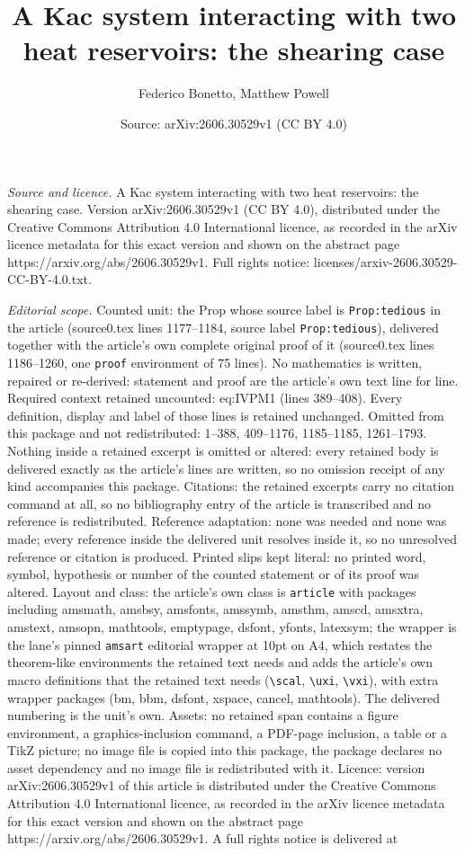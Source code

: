 \documentclass[10pt,a4paper]{amsart}
\title[A Kac system interacting with two heat reservoirs: the shear]{A Kac system interacting with two heat reservoirs: the shearing case}
\author{Federico Bonetto, Matthew Powell}
\date{Source: arXiv:2606.30529v1 (CC BY 4.0)}
\begin{document}
\maketitle

\noindent\emph{Source and licence.} A Kac system interacting with two heat reservoirs: the shearing case. Version arXiv:2606.30529v1 (CC BY 4.0), distributed under the Creative Commons Attribution 4.0 International licence, as recorded in the arXiv licence metadata for this exact version and shown on the abstract page https://arxiv.org/abs/2606.30529v1. Full rights notice: licenses/arxiv-2606.30529-CC-BY-4.0.txt.\par\smallskip

\noindent\textit{Editorial scope.} Counted unit: the Prop whose source label is \texttt{Prop:tedious} in the article (source0.tex lines 1177--1184, source label \texttt{Prop:tedious}), delivered together with the article's own complete original proof of it (source0.tex lines 1186--1260, one \texttt{proof} environment of 75 lines). No mathematics is written, repaired or re-derived: statement and proof are the article's own text line for line. Required context retained uncounted: eq:IVPM1 (lines 389--408). Every definition, display and label of those lines is retained unchanged. Omitted from this package and not redistributed: 1--388, 409--1176, 1185--1185, 1261--1793. Nothing inside a retained excerpt is omitted or altered: every retained body is delivered exactly as the article's lines are written, so no omission receipt of any kind accompanies this package. Citations: the retained excerpts carry no citation command at all, so no bibliography entry of the article is transcribed and no reference is redistributed. Reference adaptation: none was needed and none was made; every reference inside the delivered unit resolves inside it, so no unresolved reference or citation is produced. Printed slips kept literal: no printed word, symbol, hypothesis or number of the counted statement or of its proof was altered. Layout and class: the article's own class is \texttt{article} with packages including amsmath, amsbsy, amsfonts, amssymb, amsthm, amscd, amsxtra, amstext, amsopn, mathtools, emptypage, dsfont, yfonts, latexsym; the wrapper is the lane's pinned \texttt{amsart} editorial wrapper at 10pt on A4, which restates the theorem-like environments the retained text needs and adds the article's own macro definitions that the retained text needs (\texttt{\textbackslash scal}, \texttt{\textbackslash uxi}, \texttt{\textbackslash vxi}), with extra wrapper packages (bm, bbm, dsfont, xspace, cancel, mathtools). The delivered numbering is the unit's own. Assets: no retained span contains a figure environment, a graphics-inclusion command, a PDF-page inclusion, a table or a TikZ picture; no image file is copied into this package, the package declares no asset dependency and no image file is redistributed with it. Licence: version arXiv:2606.30529v1 of this article is distributed under the Creative Commons Attribution 4.0 International licence, as recorded in the arXiv licence metadata for this exact version and shown on the abstract page https://arxiv.org/abs/2606.30529v1. A full rights notice is delivered at 
\end{document}

